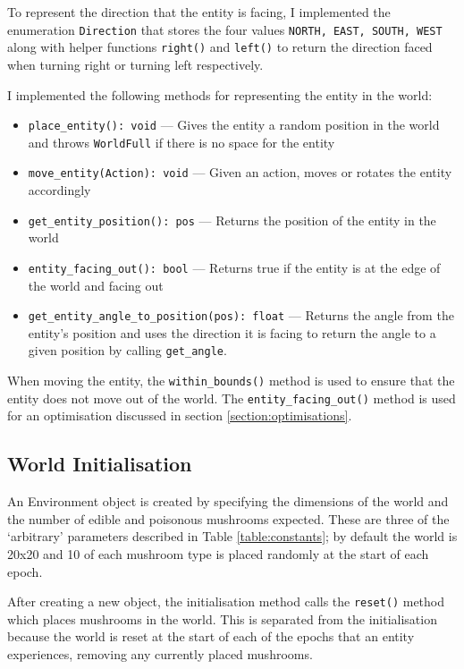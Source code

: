 \documentclass[12pt,a4paper,twoside,openright]{report}
\begin{document}
To represent the direction that the entity is facing, I implemented the enumeration \texttt{Direction} that stores the four values \texttt{NORTH, EAST, SOUTH, WEST} along with helper functions \texttt{right()} and \texttt{left()} to return the direction faced when turning right or turning left respectively.

I implemented the following methods for representing the entity in the world:

\begin{itemize}
	\item \texttt{place\_entity(): void} --- Gives the entity a random position in the world and throws \texttt{WorldFull} if there is no space for the entity
	\item \texttt{move\_entity(Action): void} --- Given an action, moves or rotates the entity accordingly
	\item \texttt{get\_entity\_position(): pos} --- Returns the position of the entity in the world
	\item \texttt{entity\_facing\_out(): bool} --- Returns true if the entity is at the edge of the world and facing out
	\item \texttt{get\_entity\_angle\_to\_position(pos): float} --- Returns the angle from the entity's position and uses the direction it is facing to return the angle to a given position by calling \texttt{get\_angle}.
\end{itemize}

When moving the entity, the \texttt{within\_bounds()} method is used to ensure that the entity does not move out of the world. The \texttt{entity\_facing\_out()} method is used for an optimisation discussed in section \ref{section:optimisations}.

\subsection{World Initialisation}

An Environment object is created by specifying the dimensions of the world and the number of edible and poisonous mushrooms expected. These are three of the `arbitrary' parameters described in Table \ref{table:constants}; by default the world is 20x20 and 10 of each mushroom type is placed randomly at the start of each epoch.

After creating a new object, the initialisation method calls the \texttt{reset()} method which places mushrooms in the world. This is separated from the initialisation because the world is reset at the start of each of the epochs that an entity experiences, removing any currently placed mushrooms.
\end{document}
